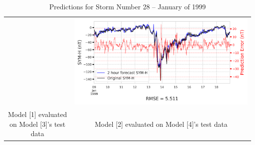 \documentclass[draft,sw]{agutexSI2019}
\begin{document}
\begin{table}
\begin{tabular}{cc}
&
\includegraphics[width=0.49\linewidth]{paper_plots/2h_swics_model_on_no_swics/2h_swics_model_on_no_swics_storm_28.png}
\\
Model [1] evaluated on Model [3]'s test data & Model [2] evaluated on Model [4]'s test data
\vspace*{12pt}
\\
\end{tabular}
\caption{Predictions for Storm Number 28 -- January of 1999}
\label{storm-28}
\end{table}
\end{document}

